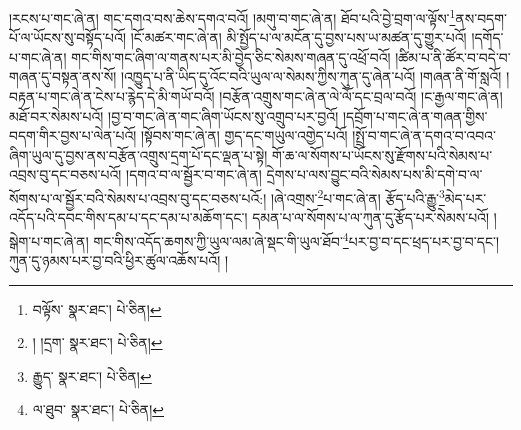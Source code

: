།རངས་པ་གང་ཞེ་ན། གང་དགའ་བས་ཆེས་དགའ་བའོ། །མགུ་བ་གང་ཞེ་ན། ཐོབ་པའི་བྱེ་བྲག་ལ་ལྟོས་\footnote{བལྟོས་  སྣར་ཐང་།  པེ་ཅིན། }ནས་བདག་པོ་ལ་ཡོངས་སུ་བསྟོད་པའོ། །ངོ་མཚར་གང་ཞེ་ན། མི་སྤྱོད་པ་ལ་མངོན་དུ་བྱས་པས་ཡ་མཚན་དུ་གྱུར་པའོ། །དགོད་པ་གང་ཞེ་ན། གང་གིས་གང་ཞིག་ལ་གནས་པར་མི་བྱེད་ཅིང་སེམས་གཞན་དུ་འཕྲོ་བའོ། །ཚིམ་པ་ནི་ཚོར་བ་བདེ་བ་གཞན་དུ་བསྟན་ནས་སོ། །འཁྱུད་པ་ནི་ཡིད་དུ་འོང་བའི་ཡུལ་ལ་སེམས་ཀྱིས་ཀུན་དུ་ཞེན་པའོ། །གཞན་ནི་གོ་སླའོ། །བརྟན་པ་གང་ཞེ་ན་ངེས་པ་རྙེད་དེ་མི་གཡོ་བའོ། །བརྩོན་འགྲུས་གང་ཞེ་ན་ལེ་ལོ་དང་བྲལ་བའོ། །ང་རྒྱལ་གང་ཞེ་ན། མཐོ་བར་སེམས་པའོ། །བྱ་བ་གང་ཞེ་ན་གང་ཞིག་ཡོངས་སུ་འགྲུབ་པར་བྱའོ། །དབྲོག་པ་གང་ཞེ་ན་གཞན་གྱིས་བདག་གིར་བྱས་པ་ལེན་པའོ། །སྟོབས་གང་ཞེ་ན། གྱད་དང་གཡུལ་འགྱེད་པའོ། །སྤྲོ་བ་གང་ཞེ་ན་དགའ་བ་འབའ་ཞིག་ཡུལ་དུ་བྱས་ནས་བརྩོན་འགྲུས་དྲག་པོ་དང་ལྡན་པ་སྟེ། གོ་ཆ་ལ་སོགས་པ་ཡོངས་སུ་རྫོགས་པའི་སེམས་པ་འབྲས་བུ་དང་བཅས་པའོ། །དགའ་བ་ལ་སྦྱོར་བ་གང་ཞེ་ན། དྲེགས་པ་ལས་བྱུང་བའི་སེམས་པས་མི་དགེ་བ་ལ་སོགས་པ་ལ་སྦྱོར་བའི་སེམས་པ་འབྲས་བུ་དང་བཅས་པའོ:། །ཞེ་འགྲས་\footnote{། །དྲག་  སྣར་ཐང་།  པེ་ཅིན། }པ་གང་ཞེ་ན། རྩོད་པའི་རྒྱུ་\footnote{རྒྱུད་  སྣར་ཐང་།  པེ་ཅིན། }མེད་པར་འདོད་པའི་དབང་གིས་དམ་པ་དང་དམ་པ་མཆོག་དང་། དམན་པ་ལ་སོགས་པ་ལ་ཀུན་དུ་རྩོད་པར་སེམས་པའོ། །སྒེག་པ་གང་ཞེ་ན། གང་གིས་འདོད་ཆགས་ཀྱི་ཡུལ་ལམ་ཞེ་སྡང་གི་ཡུལ་ཐོབ་\footnote{ལ་ཐུབ་  སྣར་ཐང་།  པེ་ཅིན། }པར་བྱ་བ་དང་ཕྲད་པར་བྱ་བ་དང་། ཀུན་དུ་ཉམས་པར་བྱ་བའི་ཕྱིར་ཚུལ་འཆོས་པའོ། །
